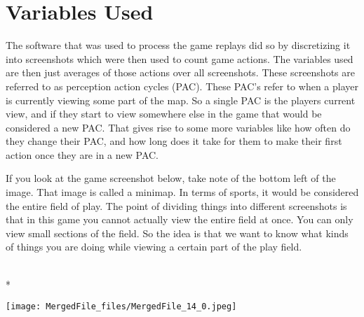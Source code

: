 \documentclass[letterpaper,10pt,english]{/usr/share/sphinx/texinputs/sphinxhowto}
\def\smaller{\fontsize{9.5pt}{9.5pt}\selectfont}
\newenvironment{InvisibleVerbatim}
        {\begin{mdframed}[leftmargin=0.1\linewidth,innerleftmargin=3pt,innerrightmargin=3pt, userdefinedwidth=1\linewidth, linewidth=0pt, linecolor=white, usetwoside=false]}
        {\end{mdframed}}
\begin{document}
        
    
\part{Variables Used}The software that was used to process the game replays did so by
discretizing it into screenshots which were then used to count game
actions. The variables used are then just averages of those actions over
all screenshots. These screenshots are referred to as perception action
cycles (PAC). These PAC's refer to when a player is currently viewing
some part of the map. So a single PAC is the players current view, and
if they start to view somewhere else in the game that would be
considered a new PAC. That gives rise to some more variables like how
often do they change their PAC, and how long does it take for them to
make their first action once they are in a new PAC.

If you look at the game screenshot below, take note of the bottom left
of the image. That image is called a minimap. In terms of sports, it
would be considered the entire field of play. The point of dividing
things into different screenshots is that in this game you cannot
actually view the entire field at once. You can only view small sections
of the field. So the idea is that we want to know what kinds of things
you are doing while viewing a certain part of the play field.

    

        
        

            
                \makebox[0.1\linewidth]{\smaller\hfill\tt\color{nbframe-out-prompt}Out\hspace{4pt}{[}33{]}:\hspace{4pt}}\\*
                \vspace{-2.55\baselineskip}\begin{InvisibleVerbatim}
                \vspace{-0.5\baselineskip}
    \begin{center}
    \texttt{[image: MergedFile\_files/MergedFile\_14\_0.jpeg]}
    \par
    \end{center}
    
            \end{InvisibleVerbatim}
            
\end{document}
